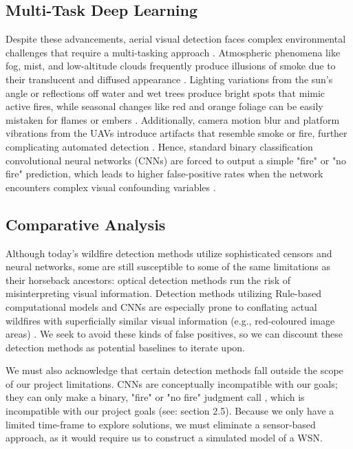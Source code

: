 \documentclass[sigconf]{acmart}
\begin{document}
\subsection{Multi-Task Deep Learning}
Despite these advancements, aerial visual detection faces complex environmental challenges that require a multi-tasking approach \cite{el-madafri}. Atmospheric phenomena like fog, mist, and low-altitude clouds frequently produce illusions of smoke due to their translucent and diffused appearance \cite{el-madafri}. Lighting variations from the sun's angle or reflections off water and wet trees produce bright spots that mimic active fires, while seasonal changes like red and orange foliage can be easily mistaken for flames or embers \cite{el-madafri}. Additionally, camera motion blur and platform vibrations from the UAVs introduce artifacts that resemble smoke or fire, further complicating automated detection \cite{el-madafri}. Hence, standard binary classification convolutional neural networks (CNNs) are forced to output a simple "fire" or "no fire" prediction, which leads to higher false-positive rates when the network encounters complex visual confounding variables \cite{el-madafri}.

\subsection{Comparative Analysis}
Although today's wildfire detection methods utilize sophisticated censors and neural networks, some are still susceptible to some of the same limitations as their horseback ancestors: optical detection methods run the risk of misinterpreting visual information. Detection methods utilizing Rule-based computational models and CNNs are especially prone to conflating actual wildfires with superficially similar visual information (e.g., red-coloured image areas) \cite{celik}\cite{el-madafri}. We seek to avoid these kinds of false positives, so we can discount these detection methods as potential baselines to iterate upon.

We must also acknowledge that certain detection methods fall outside the scope of our project limitations. CNNs are conceptually incompatible with our goals; they can only make a binary, "fire" or "no fire" judgment call \cite{el-madafri}, which is incompatible with our project goals (see: section 2.5). Because we only have a limited time-frame to explore solutions, we must eliminate a sensor-based approach, as it would require us to construct a simulated model of a WSN. 
\end{document}
